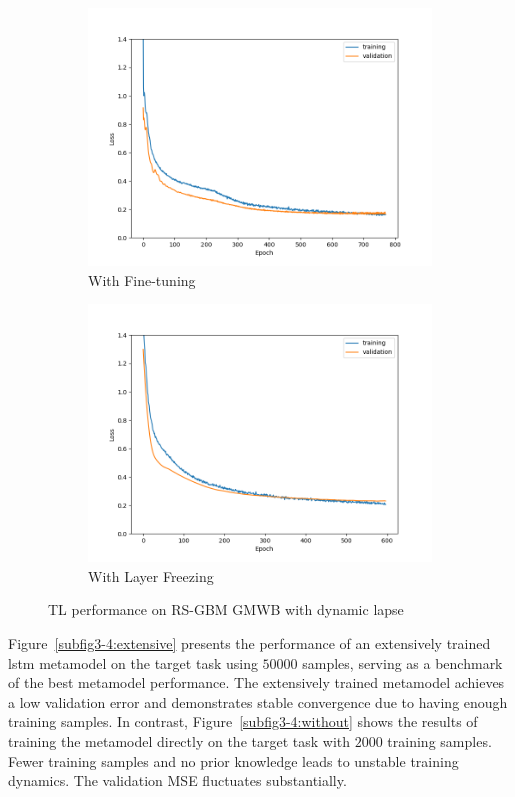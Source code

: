 \begin{figure}[ht!]
\begin{subfigure}{0.48\textwidth}
        \includegraphics[width=\textwidth]{./project3/figures/figure4c.png}
        \caption{With Fine-tuning}
        \label{subfig3-4:fineTuning}
    \end{subfigure}\hfill
    \begin{subfigure}{0.48\textwidth}
        \includegraphics[width=\textwidth]{./project3/figures/figure4d.png}
        \caption{With Layer Freezing}
        \label{subfig3-4:layerFreezing}
    \end{subfigure}
    \caption{TL performance on RS-GBM GMWB with dynamic lapse}
    \label{fig3:figure4}
\end{figure}

Figure~\ref{subfig3-4:extensive} presents the performance of an extensively trained \gls{lstm} metamodel on the target task using $\num{50000}$ samples, serving as a benchmark of the best metamodel performance. 
The extensively trained metamodel achieves a low validation error and demonstrates stable convergence due to having enough training samples. 
In contrast, Figure~\ref{subfig3-4:without} shows the results of training the metamodel directly on the target task with $\num{2000}$ training samples. 
Fewer training samples and no prior knowledge leads to unstable training dynamics. 
The validation MSE fluctuates substantially.

